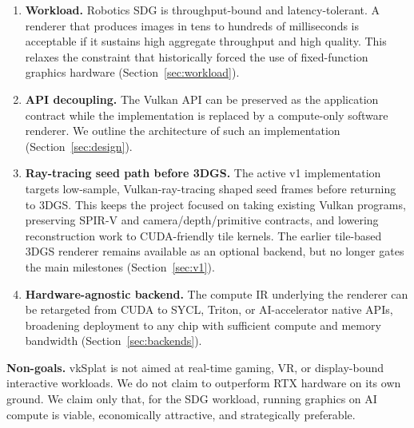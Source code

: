 \documentclass[10pt,journal]{IEEEtran}
\begin{document}
\begin{enumerate}
    \item \textbf{Workload.} Robotics SDG is throughput-bound and
    latency-tolerant. A renderer that produces images in tens to hundreds
    of milliseconds is acceptable if it sustains high aggregate throughput
    and high quality. This relaxes the constraint that historically
    forced the use of fixed-function graphics hardware
    (Section~\ref{sec:workload}).

    \item \textbf{API decoupling.} The Vulkan API can be preserved as the
    application contract while the implementation is replaced by a
    compute-only software renderer. We outline the architecture of such
    an implementation (Section~\ref{sec:design}).

    \item \textbf{Ray-tracing seed path before 3DGS.}
    The active v1 implementation targets low-sample, Vulkan-ray-tracing
    shaped seed frames before returning to 3DGS. This keeps the project
    focused on taking existing Vulkan programs, preserving SPIR-V and
    camera/depth/primitive contracts, and lowering reconstruction work
    to CUDA-friendly tile kernels. The earlier tile-based 3DGS renderer
    remains available as an optional backend, but no longer gates the
    main milestones (Section~\ref{sec:v1}).

    \item \textbf{Hardware-agnostic backend.} The compute IR underlying
    the renderer can be retargeted from CUDA to SYCL, Triton, or
    AI-accelerator native APIs, broadening deployment to any chip with
    sufficient compute and memory bandwidth (Section~\ref{sec:backends}).
\end{enumerate}

\textbf{Non-goals.} vkSplat is not aimed at real-time gaming, VR, or
display-bound interactive workloads. We do not claim to outperform RTX
hardware on its own ground. We claim only that, for the SDG workload,
running graphics on AI compute is viable, economically attractive, and
strategically preferable.
\end{document}
